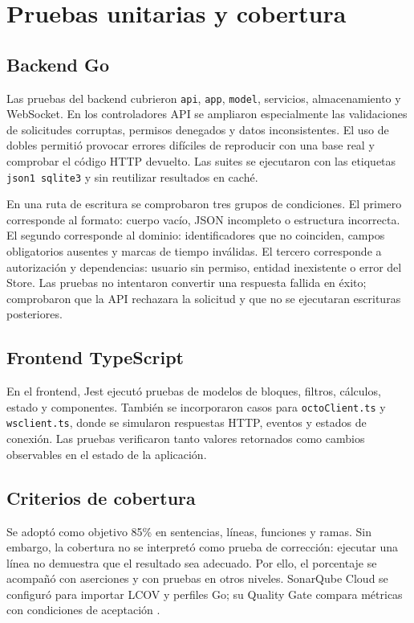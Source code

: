 \documentclass[conference]{IEEEtran}
\begin{document}
\section{Pruebas unitarias y cobertura}

\subsection{Backend Go}
Las pruebas del backend cubrieron \texttt{api}, \texttt{app}, \texttt{model}, servicios, almacenamiento y WebSocket. En los controladores API se ampliaron especialmente las validaciones de solicitudes corruptas, permisos denegados y datos inconsistentes. El uso de dobles permitió provocar errores difíciles de reproducir con una base real y comprobar el código HTTP devuelto. Las suites se ejecutaron con las etiquetas \texttt{json1 sqlite3} y sin reutilizar resultados en caché.

En una ruta de escritura se comprobaron tres grupos de condiciones. El primero corresponde al formato: cuerpo vacío, JSON incompleto o estructura incorrecta. El segundo corresponde al dominio: identificadores que no coinciden, campos obligatorios ausentes y marcas de tiempo inválidas. El tercero corresponde a autorización y dependencias: usuario sin permiso, entidad inexistente o error del Store. Las pruebas no intentaron convertir una respuesta fallida en éxito; comprobaron que la API rechazara la solicitud y que no se ejecutaran escrituras posteriores.
\vspace{\baselineskip}

\subsection{Frontend TypeScript}
En el frontend, Jest ejecutó pruebas de modelos de bloques, filtros, cálculos, estado y componentes. También se incorporaron casos para \texttt{octoClient.ts} y \texttt{wsclient.ts}, donde se simularon respuestas HTTP, eventos y estados de conexión. Las pruebas verificaron tanto valores retornados como cambios observables en el estado de la aplicación.
\vspace{\baselineskip}

\subsection{Criterios de cobertura}
Se adoptó como objetivo 85\% en sentencias, líneas, funciones y ramas. Sin embargo, la cobertura no se interpretó como prueba de corrección: ejecutar una línea no demuestra que el resultado sea adecuado. Por ello, el porcentaje se acompañó con aserciones y con pruebas en otros niveles. SonarQube Cloud se configuró para importar LCOV y perfiles Go; su Quality Gate compara métricas con condiciones de aceptación \cite{sonarGates}.
\vspace{\baselineskip}
\end{document}
